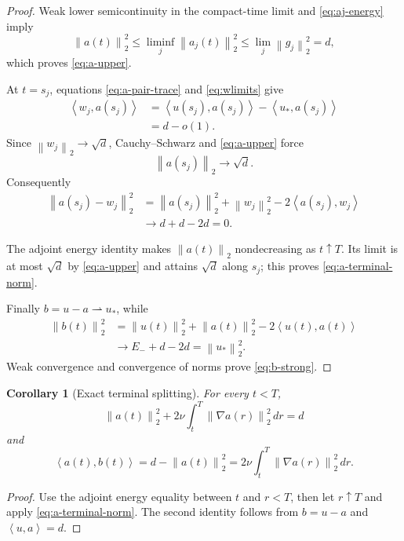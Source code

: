 \documentclass[11pt]{article}
\newtheorem{corollary}[theorem]{Corollary}
\theoremstyle{remark}
\newcommand{\norm}[1]{\left\|#1\right\|}
\newcommand{\ip}[2]{\left\langle#1,#2\right\rangle}
\newcommand{\weakto}{\rightharpoonup}
\begin{document}
\begin{proof}
Weak lower semicontinuity in the compact-time limit and
\eqref{eq:aj-energy} imply
\[
 \norm{a(t)}_2^2
 \leq\liminf_j\norm{a_j(t)}_2^2
 \leq\lim_j\norm{g_j}_2^2=d,
\]
which proves \eqref{eq:a-upper}.

At \(t=s_j\), equations \eqref{eq:a-pair-trace} and
\eqref{eq:wlimits} give
\[
\begin{aligned}
 \ip{w_j}{a(s_j)}
 &=
 \ip{u(s_j)}{a(s_j)}
 -\ip{u_*}{a(s_j)}\\
 &=d-o(1).
\end{aligned}
\]
Since \(\norm{w_j}_2\to\sqrt d\), Cauchy--Schwarz and
\eqref{eq:a-upper} force
\[
 \norm{a(s_j)}_2\longrightarrow\sqrt d.
\]
Consequently
\[
\begin{aligned}
 \norm{a(s_j)-w_j}_2^2
 &=
 \norm{a(s_j)}_2^2+\norm{w_j}_2^2
 -2\ip{a(s_j)}{w_j}\\
 &\longrightarrow d+d-2d=0.
\end{aligned}
\]

The adjoint energy identity makes \(\norm{a(t)}_2\) nondecreasing as
\(t\uparrow T\).  Its limit is at most \(\sqrt d\) by
\eqref{eq:a-upper} and attains \(\sqrt d\) along \(s_j\); this proves
\eqref{eq:a-terminal-norm}.

Finally \(b=u-a\weakto u_*\), while
\[
\begin{aligned}
 \norm{b(t)}_2^2
 &=
 \norm{u(t)}_2^2+\norm{a(t)}_2^2
 -2\ip{u(t)}{a(t)}\\
 &\longrightarrow E_-+d-2d
 =\norm{u_*}_2^2.
\end{aligned}
\]
Weak convergence and convergence of norms prove \eqref{eq:b-strong}.
\end{proof}

\begin{corollary}[Exact terminal splitting]
\label{cor:splitting}
For every \(t<T\),
\begin{equation}
\label{eq:a-tail-energy}
 \norm{a(t)}_2^2
 +2\nu\int_t^T\norm{\nabla a(r)}_2^2\,dr=d
\end{equation}
and
\begin{equation}
\label{eq:ab-tail}
 \ip{a(t)}{b(t)}
 =d-\norm{a(t)}_2^2
 =2\nu\int_t^T\norm{\nabla a(r)}_2^2\,dr.
\end{equation}
\end{corollary}

\begin{proof}
Use the adjoint energy equality between \(t\) and \(r<T\), then let
\(r\uparrow T\) and apply \eqref{eq:a-terminal-norm}.  The second
identity follows from \(b=u-a\) and \(\ip{u}{a}=d\).
\end{proof}
\end{document}
